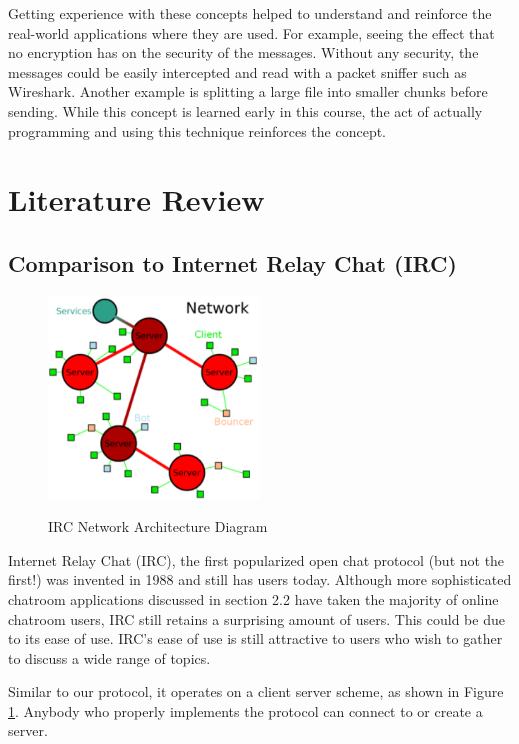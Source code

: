 \documentclass{article}
\begin{document}
Getting experience with these concepts helped to understand and reinforce the real-world applications where they are used. For example, seeing the effect that no encryption has on the security of the messages. Without any security, the messages could be easily intercepted and read with a packet sniffer such as Wireshark. Another example is splitting a large file into smaller chunks before sending. While this concept is learned early in this course, the act of actually programming and using this technique reinforces the concept.

\section{Literature Review}

\subsection{Comparison to Internet Relay Chat (IRC)}

\begin{figure}[h]
\caption{IRC Network Architecture Diagram}
\centering
\includegraphics[width=0.5\textwidth]{media/Network.PNG}
\label{Network Architecture}
\end{figure}

Internet Relay Chat (IRC), the first popularized open chat protocol (but not the first!) was invented in 1988 and still has users today. Although more sophisticated chatroom applications discussed in section 2.2 have taken the majority of online chatroom users, IRC still retains a surprising amount of users. This could be due to its ease of use. IRC's ease of use is still attractive to users who wish to gather to discuss a wide range of topics. 

Similar to our protocol, it operates on a client server scheme, as shown in Figure \ref{Network Architecture}. Anybody who properly implements the protocol can connect to or create a server. 
\end{document}

